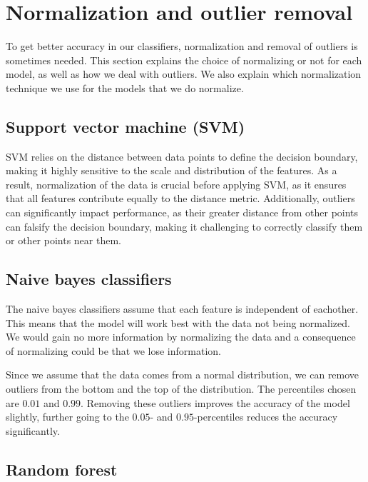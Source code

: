 \section{Normalization and outlier removal}

To get better accuracy in our classifiers, normalization and removal of outliers is sometimes needed. This section explains the choice of normalizing or not for each model, as well as how we deal with outliers. We also explain which normalization technique we use for the models that we do normalize. 

\subsection{Support vector machine (SVM)}
SVM relies on the distance between data points to define the decision boundary, making it highly sensitive to the scale and distribution of the features. As a result, normalization of the data is crucial before applying SVM, as it ensures that all features contribute equally to the distance metric.
Additionally, outliers can significantly impact performance, as their greater distance from other points can falsify the decision boundary, making it challenging to correctly classify them or other points near them.
\subsection{Naive bayes classifiers}

The naive bayes classifiers assume that each feature is independent of eachother. This means that the model will work best with the data not being normalized. We would gain no more information by normalizing the data and a consequence of normalizing could be that we lose information.
\par
Since we assume that the data comes from a normal distribution, we can remove outliers from the bottom and the top of the distribution. The percentiles chosen are $0.01$ and $0.99$. Removing these outliers improves the accuracy of the model slightly, further going to the $0.05$- and $0.95$-percentiles reduces the accuracy significantly.

\subsection{Random forest}